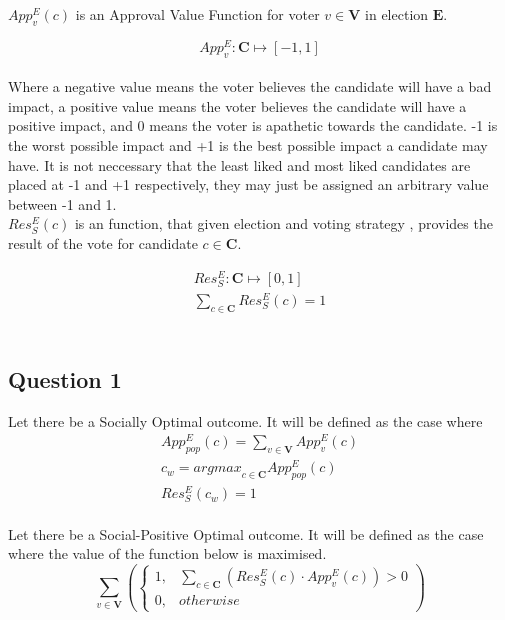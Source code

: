 \documentclass{article}
\begin{document}
$App^{E}_{v}(c)$ is an Approval Value Function for voter $v \in \pmb{V}$ in election $\pmb{E}$.

\begin{equation*}
App^{E}_{v} : \pmb{C} \mapsto [-1,1]
\end{equation*}\\

Where a negative value means the voter believes the candidate will have a bad impact, a positive value means the voter believes the candidate will have a positive impact, and 0 means the voter is apathetic towards the candidate. -1 is the worst possible impact and +1 is the best possible impact a candidate may have. It is not neccessary that the least liked and most liked candidates are placed at -1 and +1 respectively, they may just be assigned an arbitrary value between -1 and 1.\\

$Res^{E}_{S}(c)$ is an function, that given election  and voting strategy , provides the result of the vote for candidate $c \in \pmb{C}$.

\begin{gather}
Res^{E}_{S} : \pmb{C} \mapsto [0,1]\\
\sum^{}_{c \in \pmb{C}}{Res^{E}_{S}(c)} = 1
\end{gather}\\

\subsection{Question 1}

Let there be a Socially Optimal outcome. It will be defined as the case where
\begin{gather}
App^{E}_{pop}(c) = \sum^{}_{v \in \pmb{V}}{App^{E}_{v}(c)}\\
c_{w} = {argmax}_{c \in \pmb{C}} App^{E}_{pop}(c)\\
Res^{E}_{S}(c_{w}) = 1
\end{gather}\\

Let there be a Social-Positive Optimal outcome. It will be defined as the case where the value of the function below is maximised.
\begin{equation}
\sum^{}_{v \in \pmb{V}}{\left(
\begin{cases}
1, & \sum^{}_{c \in \pmb{C}}{(Res^{E}_{S}(c) \cdot App^{E}_{v}(c))} > 0\\
0, & {otherwise}
\end{cases}
\right)}
\end{equation}\\
\end{document}
